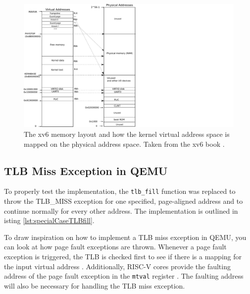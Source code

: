 \begin{figure}[t!]
    \centering
    \includegraphics[scale=.5]{figures/xv6_layout.pdf}
    \caption[xv6 memory layout]{The xv6 memory layout and how the kernel virtual address space is mapped on
        the physical address space. Taken from the xv6 book \cite{cox2011xv6}.}
    \label{impl:xv6layout}
\end{figure}


\subsection{TLB Miss Exception in QEMU}

To properly test the implementation, the \texttt{tlb\_fill} function was replaced to throw the
TLB\_MISS exception for
one specified, page-aligned address and to continue normally for every other address.
The implementation is outlined
in isting \ref{lst:specialCaseTLBfill}.






To draw inspiration on how to implement a TLB miss exception in QEMU, you can look at how
page fault exceptions are thrown.
Whenever a page fault exception is triggered, the TLB is checked first to see if there is a mapping
for the input virtual address \cite{QEMUSource2024}. Additionally, RISC-V cores provide the faulting
address of the page fault exception in the \texttt{mtval} register \cite{RISCVInstructionSet}.
The faulting address will also be necessary for handling the TLB miss exception.



